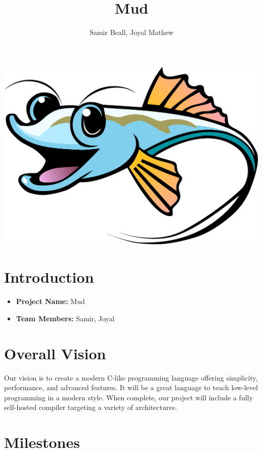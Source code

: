 \documentclass{article}
\title{Mud}
\author{Samir Beall, Joyal Mathew}
\begin{document}
\begin{center}
  \includegraphics[scale=0.125]{blue}
\end{center}

{
  \let \newpage \relax
  \maketitle
}

\section*{Introduction}

\begin{itemize}
\item
  \textbf{Project Name:} Mud
\item
  \textbf{Team Members:} Samir, Joyal
\end{itemize}

\section*{Overall Vision}

Our vision is to create a modern C-like programming language offering simplicity, performance, and advanced features. It will be a great language to teach low-level programming in a modern style. When complete, our project will include a fully self-hosted compiler targeting a variety of architectures.

\section*{Milestones}
\end{document}
